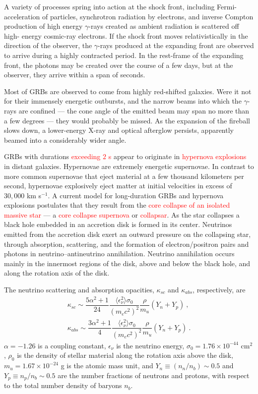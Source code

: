 \documentclass[12pt,a4paper]{article}
\begin{document}
A variety of processes spring into action at the shock front, including Fermi- acceleration of particles, synchrotron radiation by electrons, and inverse Compton production of high energy $\gamma$-rays created as ambient radiation is scattered off high- energy cosmic-ray electrons. If the shock front moves relativistically in the direction of the observer, the $\gamma$-rays produced at the expanding front are observed to arrive during a highly contracted period. In the rest-frame of the expanding front, the photons may be created over the course of a few days, but at the observer, they arrive within a span of seconds.

Most of GRBs are observed to come from highly red-shifted galaxies. Were it not for their immensely energetic outbursts, and the narrow beams into which the $\gamma$-rays are confined ---  the cone angle of the emitted beam may span no more than a few degrees --- they would probably be missed. As the expansion of the fireball slows down, a lower-energy X-ray and optical afterglow persists, apparently beamed into a considerably wider angle. 



GRBs with durations \textcolor{red}{exceeding $2$ s} appear to originate in \textcolor{red}{hypernova explosions} in distant galaxies. Hypernovae are extremely energetic supernovae. In contrast to more common supernovae that eject material at a few thousand kilometers per second, hypernovae explosively eject matter at initial velocities in excess of $30,000$ km s$^{-1}$. A current model for long-duration GRBs and hypernova explosions postulates that they result from the \textcolor{red}{core collapse of an isolated massive star} --- a \textcolor{red}{core collapse supernova} or \textcolor{red}{collapsar}. As the star collapses a black hole embedded in an accretion disk is formed in its center. Neutrinos emitted from the accretion disk exert an outward pressure on the collapsing star, through absorption, scattering, and the formation of electron/positron pairs and photons in neutrino–antineutrino annihilation. Neutrino annihilation occurs mainly in the innermost regions of the disk, above and below the black hole, and along the rotation axis of the disk.

The neutrino scattering and absorption opacities, $\kappa_{sc}$ and $\kappa_{abs}$, respectively, are
\begin{align}
\kappa_{sc} \sim \dfrac{5\alpha^2 +1}{24} \dfrac{\langle \epsilon_\nu^2\rangle \sigma_0}{(m_e c^2)^2 } \dfrac{\rho}{m_u} (Y_n+Y_p) ~, \\
\kappa_{abs} \sim \dfrac{3\alpha^2 +1}{4} \dfrac{\langle \epsilon_\nu^2\rangle \sigma_0}{(m_e c^2)^2 } \dfrac{\rho}{m_u} (Y_n+Y_p) ~.
\end{align}
$\alpha = -1.26$ is a coupling constant, $\epsilon_\nu$ is the neutrino energy, $\sigma_0 = 1.76 \times 10^{-44}$ cm$^2$, $\rho_0$ is the density of stellar material along the rotation axis above the disk, $m_u = 1.67 \times 10^{-24}$ g is the atomic mass unit, and $Y_n \equiv (n_n/n_b) \sim 0.5$ and $Y_p \equiv n_p/n_b \sim 0.5$ are the number fractions of neutrons and protons, with respect to the total number density of baryons $n_b$.
\end{document}
